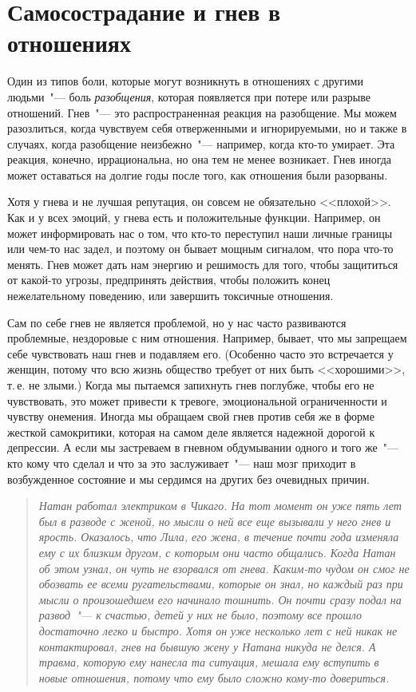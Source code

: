 
\chapter{Самосострадание и гнев в отношениях} \label{Self-Compassion_and_Anger_in_Relationships}

Один из типов боли, которые могут возникнуть в отношениях с другими людьми~"--- боль \emph{разобщения}, которая появляется при потере или разрыве отношений. Гнев~"--- это распространенная реакция на разобщение. Мы можем разозлиться, когда чувствуем себя отверженными и игнорируемыми, но и также в случаях, когда разобщение неизбежно~"--- например, когда кто-то умирает. Эта реакция, конечно, иррациональна, но она тем не менее возникает. Гнев иногда может оставаться на долгие годы после того, как отношения были разорваны.

Хотя у гнева и не лучшая репутация, он совсем не обязательно <<плохой>>. Как и у всех эмоций, у гнева есть и положительные функции\cite{105}. Например, он может информировать нас о том, что кто-то переступил наши личные границы или чем-то нас задел, и поэтому он бывает мощным сигналом, что пора что-то менять. Гнев может дать нам энергию и решимость для того, чтобы защититься от какой-то угрозы, предпринять действия, чтобы положить конец нежелательному поведению, или завершить токсичные отношения.

Сам по себе гнев не является проблемой, но у нас часто развиваются проблемные, нездоровые с ним отношения. Например, бывает, что мы запрещаем себе чувствовать наш гнев и подавляем его. (Особенно часто это встречается у женщин, потому что всю жизнь общество требует от них быть <<хорошими>>, т.\,е. не злыми.) Когда мы пытаемся запихнуть гнев поглубже, чтобы его не чувствовать, это может привести к тревоге, эмоциональной ограниченности и чувству онемения\cite{106}. Иногда мы обращаем свой гнев против себя же в форме жесткой самокритики, которая на самом деле является надежной дорогой к депрессии\cite{107}. А если мы застреваем в гневном обдумывании одного и того же~"--- кто кому что сделал и что за это заслуживает~"--- наш мозг приходит в возбужденное состояние и мы сердимся на других без очевидных причин\cite{108}. 

\begin{quotation}
	\textit{
		Натан работал электриком в Чикаго. На тот момент он уже пять лет был в разводе с женой, но мысли о ней все еще вызывали у него гнев и ярость. Оказалось, что Лила, его жена, в течение почти года изменяла ему с их близким другом, с которым они часто общались. Когда Натан об этом узнал, он чуть не взорвался от гнева. Каким-то чудом он смог не обозвать ее всеми ругательствами, которые он знал, но каждый раз при мысли о произошедшем его начинало тошнить. Он почти сразу подал на развод~"--- к счастью, детей у них не было, поэтому все прошло достаточно легко и быстро. Хотя он уже несколько лет с ней никак не контактировал, гнев на бывшую жену у Натана никуда не делся. А травма, которую ему нанесла та ситуация, мешала ему вступить в новые отношения, потому что ему было сложно кому-то довериться.
	}
\end{quotation}

